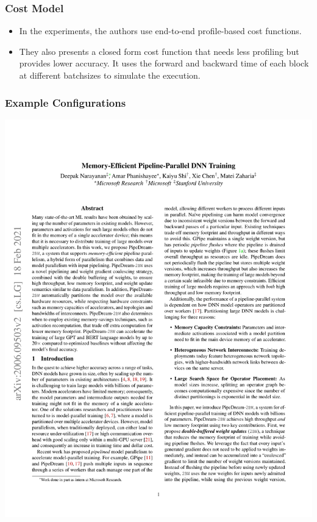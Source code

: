 \documentclass[12pt,aspectratio=169]{beamer}
\begin{document}
    \begin{frame}
        \frametitle{Cost Model}

        \begin{itemize}
            \setlength{\itemsep}{.8em}
            \item In the experiments, the authors use end-to-end profile-based cost functions.
            \item They also presents a closed form cost function that needs less profiling but provides lower accuracy.
            It uses the forward and backward time of each block at different batchsizes to simulate the execution.
        \end{itemize}
    \end{frame}

    \begin{frame}
        \frametitle{Example Configurations}

        \begin{center}
            \includegraphics[page=7,trim=2cm 20.8cm 11cm 1.9cm,clip,scale=1.1]{pipedream-2bw.pdf}
        \end{center}
    \end{frame}
\end{document}
